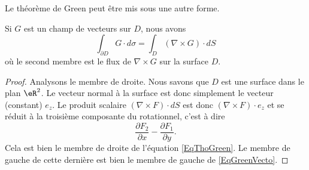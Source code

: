 Le théorème de Green peut être mis sous une autre forme.

\begin{theorem}       \label{ThoGreenVecto}
    Si $G$ est un champ de vecteurs sur $D$, nous avons
    \begin{equation}        \label{EqGreenVecto}
        \int_{\partial D}G\cdot d\sigma=\int_D(\nabla\times G)\cdot dS
    \end{equation}
    où le second membre est le flux de $\nabla\times G$ sur la surface $D$.
\end{theorem}

\begin{proof}
    Analysons le membre de droite. Nous savons que $D$ est une surface dans le plan $\eR^2$. Le vecteur normal à la surface est donc simplement le vecteur (constant) $e_z$. Le produit scalaire $(\nabla\times F)\cdot dS$ est donc $(\nabla\times F)\cdot e_z$ et se réduit à la troisième composante du rotationnel, c'est à dire
    \begin{equation}
        \frac{ \partial F_2 }{ \partial x }-\frac{ \partial F_1 }{ \partial y }.
    \end{equation}
    Cela est bien le membre de droite de l'équation \eqref{EqThoGreen}. Le membre de gauche de cette dernière est bien le membre de gauche de \eqref{EqGreenVecto}.
\end{proof}

